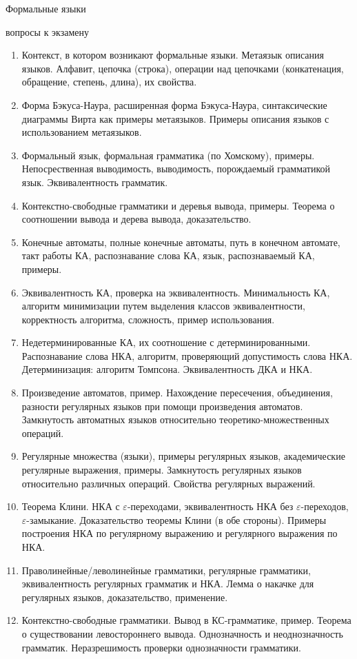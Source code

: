 \documentclass[12pt]{article}
\newcommand{\litem}[1]{\item #1 }%
\begin{document}
\begin{center} 
\LARGE Формальные языки

\Large вопросы к экзамену
\end{center}

\begin{enumerate}
  \litem {Контекст, в котором возникают формальные языки. Метаязык описания языков. Алфавит, цепочка (строка), операции над цепочками (конкатенация, обращение, степень, длина), их свойства.} 
  \litem {Форма Бэкуса-Наура, расширенная форма Бэкуса-Наура, синтаксические диаграммы Вирта как примеры метаязыков. Примеры описания языков с использованием метаязыков. }
  \litem {Формальный язык, формальная грамматика (по Хомскому), примеры. Непосрественная выводимость, выводимость, порождаемый грамматикой язык. Эквивалентность грамматик. }
  \litem {Контекстно-свободные грамматики и деревья вывода, примеры. Теорема о соотношении вывода и дерева вывода, доказательство.}
  \litem {Конечные автоматы, полные конечные автоматы, путь в конечном автомате, такт работы КА, распознавание слова КА, язык, распознаваемый КА, примеры. }
  \litem {Эквивалентность КА, проверка на эквивалентность. Минимальность КА, алгоритм минимизации путем выделения классов эквивалентности, корректность алгоритма, сложность, пример использования. }
  \litem {Недетерминированные КА, их соотношение с детерминированными. Распознавание слова НКА, алгоритм, проверяющий допустимость слова НКА. Детерминизация: алгоритм Томпсона. Эквивалентность ДКА и НКА.}
  \litem {Произведение автоматов, пример. Нахождение пересечения, объединения, разности регулярных языков при помощи произведения автоматов. Замкнутость автоматных языков относительно теоретико-множественных операций. }
  \litem {Регулярные множества (языки), примеры регулярных языков, академические регулярные выражения, примеры. Замкнутость регулярных языков относительно различных операций. Свойства регулярных выражений. }
  \litem {Теорема Клини. НКА с $\varepsilon$-переходами, эквивалентность НКА без $\varepsilon$-переходов, $\varepsilon$-замыкание. Доказательство теоремы Клини (в обе стороны). Примеры построения НКА по регулярному выражению и регулярного выражения по НКА.}
  \litem {Праволинейные/леволинейные грамматики, регулярные грамматики, эквивалентность регулярных грамматик и НКА. Лемма о накачке для регулярных языков, доказательство, применение. }
  \litem {Контекстно-свободные грамматики. Вывод в КС-грамматике, пример. Теорема о существовании левостороннего вывода. Однозначность и неоднозначность грамматик. Неразрешимость проверки однозначности грамматики. }

\end{enumerate}
\end{document}
